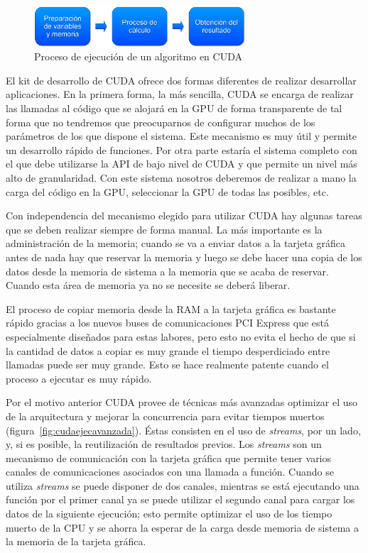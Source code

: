 \begin{figure}
	\centering
	\includegraphics[width=0.7\textwidth]{images/proc_ejec1.pdf}
	\caption{Proceso de ejecución de un algoritmo en CUDA}\label{fig:procejecuda}
\end{figure}

El kit de desarrollo de CUDA ofrece dos formas diferentes de realizar desarrollar aplicaciones. En la primera forma, la más sencilla, CUDA se encarga de realizar las llamadas al código que se alojará en la GPU de forma transparente de tal forma que no tendremos que preocuparnos de configurar muchos de los parámetros de los que dispone el sistema. Este mecanismo es muy útil y permite un desarrollo rápido de funciones. Por otra parte estaría el sistema completo con el que debe utilizarse la API de bajo nivel de CUDA y que permite un nivel más alto de granularidad. Con este sistema nosotros deberemos de realizar a mano la carga del código en la GPU, seleccionar la GPU de todas las posibles, etc.

Con independencia del mecanismo elegido para utilizar CUDA hay algunas tareas que se deben realizar siempre de forma manual. La más importante es la administración de la memoria; cuando se va a enviar datos a la tarjeta gráfica antes de nada hay que reservar la memoria y luego se debe hacer una copia de los datos desde la memoria de sistema a la memoria que se acaba de reservar. Cuando esta área de memoria ya no se necesite se deberá liberar.

El proceso de copiar memoria desde la RAM a la tarjeta gráfica es bastante rápido gracias a los nuevos buses de comunicaciones PCI Express que está especialmente diseñados para estas labores, pero esto no evita el hecho de que si la cantidad de datos a copiar es muy grande el tiempo desperdiciado entre llamadas puede ser muy grande. Esto se hace realmente patente cuando el proceso a ejecutar es muy rápido.

Por el motivo anterior CUDA provee de técnicas más avanzadas optimizar el uso de la arquitectura y mejorar la concurrencia para evitar tiempos muertos (figura~\ref{fig:cudaejecavanzada}). Éstas consisten en el uso de \emph{streams}, por un lado, y, si es posible, la reutilización de resultados previos. Los \emph{streams} son un mecanismo de comunicación con la tarjeta gráfica que permite tener varios canales de comunicaciones asociados con una llamada a función. Cuando se utiliza \emph{streams} se puede disponer de dos canales, mientras se está ejecutando una función por el primer canal ya se puede utilizar el segundo canal para cargar los datos de la siguiente ejecución; esto permite optimizar el uso de los tiempo muerto de la CPU y se ahorra la esperar de la carga desde memoria de sistema a la memoria de la tarjeta gráfica.

